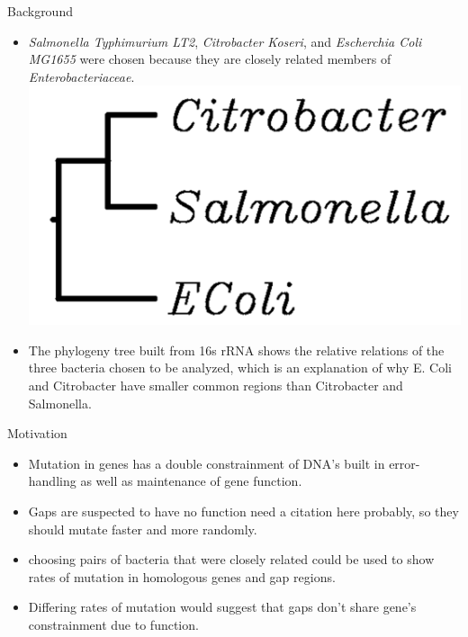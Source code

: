 \documentclass[final]{beamer}
\begin{document}
\begin{frame}{}
\begin{columns}[t]
\begin{column}{.32 \linewidth}
\begin{block}{\large Background}
\begin{itemize}
\item \textit{Salmonella Typhimurium LT2}, \textit{Citrobacter Koseri}, and \textit{Escherchia Coli MG1655} were chosen because they are closely related members of \textit{Enterobacteriaceae}.
\newline
\includegraphics[scale = 1]{phylogeny.png}
\newline
\item The phylogeny tree built from 16s rRNA shows the relative relations of the three bacteria chosen to be analyzed, which is an explanation of why E. Coli and Citrobacter have smaller common regions than Citrobacter and Salmonella.
\end{itemize}
\end{block}

 \begin{block}{\large Motivation}
 
 \begin{itemize}
 
\item Mutation in genes has a double constrainment of DNA's built in error-handling as well as maintenance of gene function. 

\item Gaps are suspected to have no function need a citation here probably, so they should mutate faster and more randomly. 

\item choosing pairs of bacteria that were closely related could be used to show rates of mutation in homologous genes and gap regions. 

\item Differing rates of mutation would suggest that gaps don't share gene's constrainment due to function.
\end{itemize}
\end{block}


\end{column}
\end{columns}
\end{frame}
\end{document}
